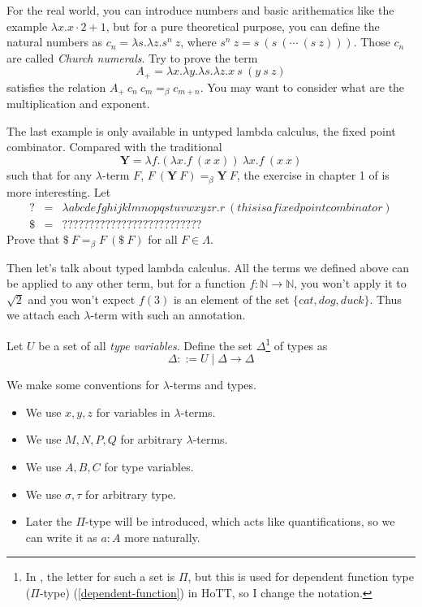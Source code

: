 For the real world, you can introduce numbers and basic arithematics like
the example $\lambda x. x \cdot 2 + 1$, but for a pure theoretical 
purpose, you can define the natural numbers as $c_n=\lambda s.\lambda z. s^n\ z$, 
where $s^n\ z = s\ (s\ (\cdots\ (s\ z)))$. Those $c_n$ are called {\it
Church numerals}. Try to prove the term $$A_+=\lambda x.\lambda y.
\lambda s.\lambda z.x\ s\ (y\ s\ z)$$ satisfies the relation 
$A_+\ c_n\ c_m=_\beta c_{m+n}$. You may want to consider what are the 
multiplication and exponent. 

The last example is only available in untyped lambda calculus, the fixed 
point combinator. Compared with the traditional 
\newcommand{\Ycomb}{\mathbf{Y}}
$$\Ycomb = \lambda f.(\lambda x.f\ (x\ x))\ \lambda x.f\ (x\ x)$$
such that for any $\lambda$-term $F$, 
$F\ (\Ycomb\ F)=_\beta \Ycomb\ F$, the exercise in chapter 1 of 
\cite{Curry-Howard} is more interesting. Let
$$
\begin{array}{lll}
    ? &=& \lambda abcdefghijklmnopqstuvwxyzr.r\ (thisisafixedpointcombinator) \\
    \$ &=& ??????????????????????????
\end{array}
$$
Prove that $\$\ F=_\beta F\ (\$\ F)$ for all $F\in\Lambda$.

Then let's talk about typed lambda calculus. All the terms we defined
above can be applied to any other term, but for a function 
$f: \mathbb{N}\to\mathbb{N}$, you won't apply it to $\sqrt 2$ and 
you won't expect $f(3)$ is an element of the set $\{cat,dog,duck\}$.
Thus we attach each $\lambda$-term with such an annotation. 

Let $U$ be a set of all {\it type variables}. Define the set 
$\Delta$\footnote{In \cite{Curry-Howard}, the letter for such a set is
$\Pi$, but this is used for dependent function type ($\Pi$-type) 
(\autoref{dependent-function}) in HoTT, so I change the notation.} of
types as
$$
    \Delta ::= U \mid \Delta \to \Delta
$$

We make some conventions for $\lambda$-terms and types.
\begin{itemize}
    \item We use $x,y,z$ for variables in $\lambda$-terms.
    \item We use $M,N,P,Q$ for arbitrary $\lambda$-terms.
    \item We use $A,B,C$ for type variables.
    \item We use $\sigma,\tau$ for arbitrary type.
    \item Later the $\Pi$-type will be introduced, which acts
    like quantifications, so we can write it as $a: A$ more
    naturally.
\end{itemize}

